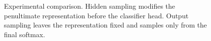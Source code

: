 \begin{figure}[t]
    \centering
    \caption{Experimental comparison. Hidden sampling modifies the penultimate representation before the classifier head. Output sampling leaves the representation fixed and samples only from the final softmax.}
    \label{fig:method}
\end{figure}
